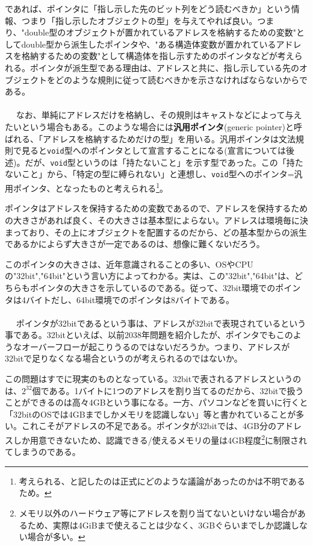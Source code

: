 であれば、ポインタに「指し示した先のビット列をどう読むべきか」という情報、つまり「指し示したオブジェクトの型」を与えてやれば良い。つまり、"double型のオブジェクトが置かれているアドレスを格納するための変数"としてdouble型から派生したポインタや、"ある構造体変数が置かれているアドレスを格納するための変数"として構造体を指し示すためのポインタなどが考えられる。ポインタが派生型である理由は、アドレスと共に、指し示している先のオブジェクトをどのような規則に従って読むべきかを示さなければならないからである。
\\ \\　
なお、単純にアドレスだけを格納し、その規則はキャストなどによって与えたいという場合もある。このような場合には\textbf{汎用ポインタ}(generic pointer)と呼ばれる、「アドレスを格納するためだけの型」を用いる。汎用ポインタは文法規則で見ると\verb|void|型へのポインタとして宣言することになる(宣言については後述)。だが、\verb|void|型というのは「持たないこと」を示す型であった。この「持たないこと」から、「特定の型に縛られない」と連想し、\verb|void|型へのポインタ=汎用ポインタ、となったものと考えられる\footnote{考えられる、と記したのは正式にどのような議論があったのかは不明であるため。}。

ポインタはアドレスを保持するための変数であるので、アドレスを保持するための大きさがあれば良く、その大きさは基本型によらない。アドレスは環境毎に決まっており、その上にオブジェクトを配置するのだから、どの基本型からの派生であるかによらず大きさが一定であるのは、想像に難くないだろう。

このポインタの大きさは、近年意識されることの多い、OSやCPUの"32bit","64bit"という言い方によってわかる。実は、この"32bit","64bit"は、どちらもポインタの大きさを示しているのである。従って、32bit環境でのポインタは4バイトだし、64bit環境でのポインタは8バイトである。
\\ \\　
ポインタが32bitであるという事は、アドレスが32bitで表現されているという事である。32bitといえば、以前2038年問題を紹介したが、ポインタでもこのようなオーバーフローが起こりうるのではないだろうか。つまり、アドレスが32bitで足りなくなる場合というのが考えられるのではないか。

この問題はすでに現実のものとなっている。32bitで表されるアドレスというのは、$2^{32}$個である。1バイトに1つのアドレスを割り当てるのだから、32bitで扱うことができるのは高々4GBという事になる。一方、パソコンなどを買いに行くと「32bitのOSでは4GBまでしかメモリを認識しない」等と書かれていることが多い。これこそがアドレスの不足である。ポインタが32bitでは、4GB分のアドレスしか用意できないため、認識できる/使えるメモリの量は4GB程度\footnote{メモリ以外のハードウェア等にアドレスを割り当てないといけない場合があるため、実際は4GiBまで使えることは少なく、3GBぐらいまでしか認識しない場合が多い。}に制限されてしまうのである。


